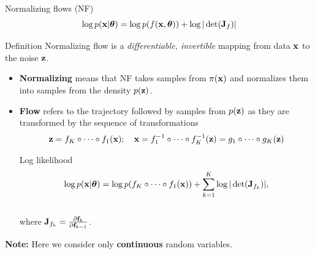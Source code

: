 \begin{frame}{Normalizing flows (NF)}
	\vspace{-0.3cm}
	\[
	\log p(\mathbf{x}|\boldsymbol{\theta}) = \log p(f(\mathbf{x}, \boldsymbol{\theta})) + \log |\det (\mathbf{J}_f)|
	\]
	\vspace{-0.4cm}
	\begin{block}{Definition}
		Normalizing flow is a \textit{differentiable, invertible} mapping from data $\mathbf{x}$ to the noise $\mathbf{z}$. 
	\end{block}
	\begin{itemize}
		\item \textbf{Normalizing} means that NF takes samples from $\pi(\mathbf{x})$ and normalizes them into samples from the density $p(\mathbf{z})$.
		\item \textbf{Flow} refers to the trajectory followed by samples from $p(\mathbf{z})$ as they are transformed by the sequence of transformations
		\[
		\mathbf{z} = f_K \circ \dots \circ f_1(\mathbf{x}); \quad \mathbf{x} = f_1^{-1} \circ \dots \circ f_K^{-1} (\mathbf{z}) = g_1 \circ \dots \circ g_K(\mathbf{z}) 
		\] 
		\vspace{-0.4cm}
		\begin{block}{Log likelihood}
			\vspace{-0.4cm}
			\[
			\log p(\mathbf{x} | \boldsymbol{\theta}) = \log p(f_K \circ \dots \circ f_1(\mathbf{x})) + \sum_{k=1}^K\log |\det (\mathbf{J}_{f_k})|,
			\]
			\vspace{-0.4cm} \\
			where $\mathbf{J}_{f_k} = \frac{\partial \mathbf{f}_k}{\partial \mathbf{f}_{k-1}}$.
		\end{block}
	\end{itemize}
	\textbf{Note:} Here we consider only \textbf{continuous} random variables.
\end{frame}
